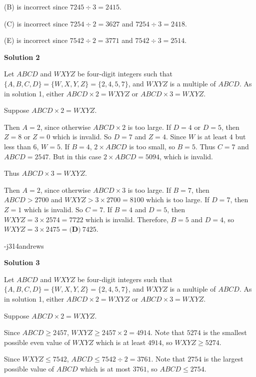 \begin{enumerate}
 (B) is incorrect since $7245 \div 3 = 2415$.

 (C) is incorrect since $7254 \div 2 = 3627$ and $7254 \div 3 = 2418$.

 (E) is incorrect since $7542 \div 2 = 3771$ and $7542 \div 3 = 2514$.

 



\textbf{Solution 2}

Let $ABCD$ and $WXYZ$ be four-digit integers such that $\{A, B, C, D\}=\{W, X, Y, Z\}=\{2,4,5,7\}$, and $WXYZ$ is a multiple of $ABCD$.  As in solution 1, either $ABCD \times 2 = WXYZ$ or $ABCD \times 3 = WXYZ$.

 Suppose $ABCD \times 2 = WXYZ$.  

 Then $A = 2$, since otherwise $ABCD \times 2$ is too large.  If $D = 4$ or $D = 5$, then $Z = 8$ or $Z = 0$ which is invalid.  So $D = 7$ and $Z = 4$.  Since $W$ is at least $4$ but less than $6$, $W = 5$.  If $B = 4$, $2 \times ABCD$ is too small, so $B = 5$.  Thus $C = 7$ and $ABCD = 2547$.  But in this case $2 \times ABCD = 5094$, which is invalid.

 Thus $ABCD \times 3 = WXYZ$.  

 Then $A = 2$, since otherwise $ABCD \times 3$ is too large.  If $B = 7$, then $ABCD > 2700$ and $WXYZ > 3 \times 2700 = 8100$ which is too large.  If $D = 7$, then $Z = 1$ which is invalid.  So $C = 7$.  If $B = 4$ and $D = 5$, then $WXYZ = 3 \times 2574 = 7722$ which is invalid.  Therefore, $B = 5$ and $D = 4$, so $WXYZ = 3 \times 2475 = \boxed{\textbf{(D)}\ 7425}$.

 -j314andrews

 



\textbf{Solution 3}

Let $ABCD$ and $WXYZ$ be four-digit integers such that $\{A, B, C, D\}=\{W, X, Y, Z\}=\{2,4,5,7\}$, and $WXYZ$ is a multiple of $ABCD$.  As in solution 1, either $ABCD \times 2 = WXYZ$ or $ABCD \times 3 = WXYZ$.

 Suppose $ABCD \times 2 = WXYZ$.

 Since $ABCD \geq 2457$, $WXYZ \geq 2457 \times 2 = 4914$.  Note that $5274$ is the smallest possible even value of $WXYZ$ which is at least $4914$, so $WXYZ \geq 5274$.

 Since $WXYZ \leq 7542$, $ABCD \leq 7542 \div 2 = 3761$.  Note that $2754$ is the largest possible value of $ABCD$ which is at most $3761$, so $ABCD \leq 2754$.


\end{enumerate}

